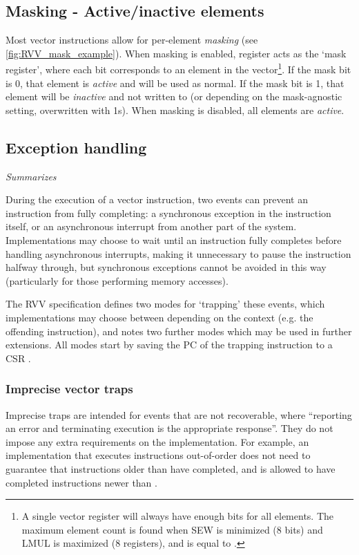 \subsection{Masking - Active/inactive elements}\label{chap:bg:subsec:masking}
Most vector instructions allow for per-element \emph{masking} (see \cref{fig:RVV_mask_example}).
When masking is enabled, register  acts as the `mask register', where each bit corresponds to an element in the vector\footnote{A single vector register will always have enough bits for all elements. The maximum element count is found when SEW is minimized (8 bits) and LMUL is maximized (8 registers), and is equal to .}.
If the mask bit is 0, that element is \emph{active} and will be used as normal.
If the mask bit is 1, that element will be \emph{inactive} and not written to (or depending on the mask-agnostic setting, overwritten with 1s).
When masking is disabled, all elements are \emph{active}.

\pagebreak
\subsection{Exception handling}\label{chap:bg:subsec:vexceptions}
\emph{Summarizes \cite[Section 17]{RISCVVectorExtension2021}}

During the execution of a vector instruction, two events can prevent an instruction from fully completing: a synchronous exception in the instruction itself, or an asynchronous interrupt from another part of the system.
Implementations may choose to wait until an instruction fully completes before handling asynchronous interrupts, making it unnecessary to pause the instruction halfway through, but synchronous exceptions cannot be avoided in this way (particularly for those performing memory accesses).

The RVV specification defines two modes for `trapping' these events, which implementations may choose between depending on the context (e.g. the offending instruction), and notes two further modes which may be used in further extensions.
All modes start by saving the PC of the trapping instruction to a CSR .

\subsubsection{Imprecise vector traps}
Imprecise traps are intended for events that are not recoverable, where \enquote{reporting an error and terminating execution is the appropriate response}.
They do not impose any extra requirements on the implementation.
For example, an implementation that executes instructions out-of-order does not need to guarantee that instructions older than  have completed, and is allowed to have completed instructions newer than .

